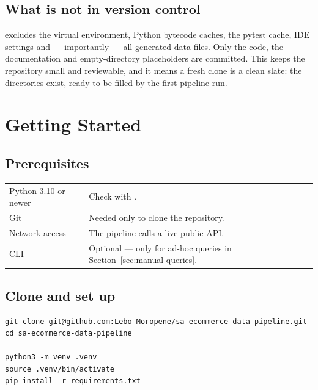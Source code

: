 \subsection{What is not in version control}

 excludes the virtual environment, Python bytecode caches,
the pytest cache, IDE settings and --- importantly --- all generated data
files. Only the code, the documentation and empty-directory placeholders are
committed. This keeps the repository small and reviewable, and it means a
fresh clone is a clean slate: the  directories exist, ready to
be filled by the first pipeline run.

\section{Getting Started}

\subsection{Prerequisites}

\noindent
\begin{tabularx}{\textwidth}{@{}L{4.4cm}Y@{}}
 &  \\
\midrule
Python 3.10 or newer & Check with . \\
Git & Needed only to clone the repository. \\
Network access & The pipeline calls a live public API. \\
 CLI & Optional --- only for ad-hoc queries in Section~\ref{sec:manual-queries}. \\
\end{tabularx}

\subsection{Clone and set up}

\begin{codebox}
\noindent
\begin{lstlisting}[style=sh]
git clone git@github.com:Lebo-Moropene/sa-ecommerce-data-pipeline.git
cd sa-ecommerce-data-pipeline

python3 -m venv .venv
source .venv/bin/activate
pip install -r requirements.txt
\end{lstlisting}
\end{codebox}

